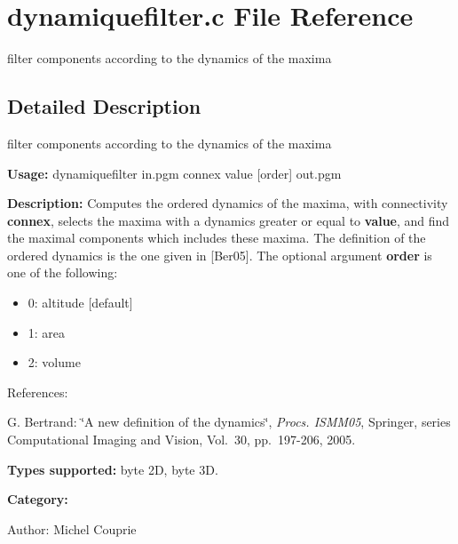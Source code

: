 \section{dynamiquefilter.c File Reference}
\label{dynamiquefilter_8c}
filter components according to the dynamics of the maxima  




\label{_details}
\subsection{Detailed Description}
filter components according to the dynamics of the maxima 

{\bf Usage:} dynamiquefilter in.pgm connex value [order] out.pgm

{\bf Description:} Computes the ordered dynamics of the maxima, with connectivity {\bf connex}, selects the maxima with a dynamics greater or equal to {\bf value}, and find the maximal components which includes these maxima. The definition of the ordered dynamics is the one given in [Ber05]. The optional argument {\bf order} is one of the following: \begin{itemize}
\item 0: altitude [default] \item 1: area \item 2: volume\end{itemize}
References:\par
 [Ber05] G. Bertrand: \char`\"{}A new definition of the dynamics\char`\"{}, {\em Procs. ISMM05\/}, Springer, series Computational Imaging and Vision, Vol.~30, pp.~197-206, 2005.\par


{\bf Types supported:} byte 2D, byte 3D.

{\bf Category:}

\begin{Desc}
\item[Author:]Michel Couprie \end{Desc}
